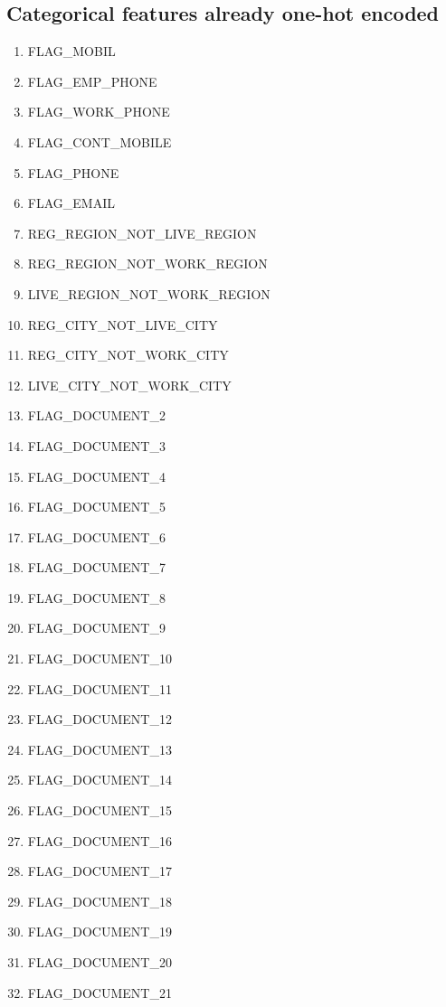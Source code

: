 \documentclass[12pt, letterpaper]{article}
\begin{document}
\begin{appendices}
\subsection{Categorical features already one-hot encoded}
\label{catfeatalreadyonehotencoded}
\footnotesize
\begin{enumerate}
 \item FLAG_MOBIL
 \item FLAG_EMP_PHONE
 \item FLAG_WORK_PHONE
 \item FLAG_CONT_MOBILE
 \item FLAG_PHONE
 \item FLAG_EMAIL
 \item REG_REGION_NOT_LIVE_REGION
 \item REG_REGION_NOT_WORK_REGION
 \item LIVE_REGION_NOT_WORK_REGION
 \item REG_CITY_NOT_LIVE_CITY
 \item REG_CITY_NOT_WORK_CITY
 \item LIVE_CITY_NOT_WORK_CITY
 \item FLAG_DOCUMENT_2
 \item FLAG_DOCUMENT_3
 \item FLAG_DOCUMENT_4
 \item FLAG_DOCUMENT_5
 \item FLAG_DOCUMENT_6
 \item FLAG_DOCUMENT_7
 \item FLAG_DOCUMENT_8
 \item FLAG_DOCUMENT_9
 \item FLAG_DOCUMENT_10
 \item FLAG_DOCUMENT_11
 \item FLAG_DOCUMENT_12
 \item FLAG_DOCUMENT_13
 \item FLAG_DOCUMENT_14
 \item FLAG_DOCUMENT_15
 \item FLAG_DOCUMENT_16
 \item FLAG_DOCUMENT_17
 \item FLAG_DOCUMENT_18
 \item FLAG_DOCUMENT_19
 \item FLAG_DOCUMENT_20
 \item FLAG_DOCUMENT_21
\end{enumerate}
\normalsize


\end{appendices}
\end{document}
